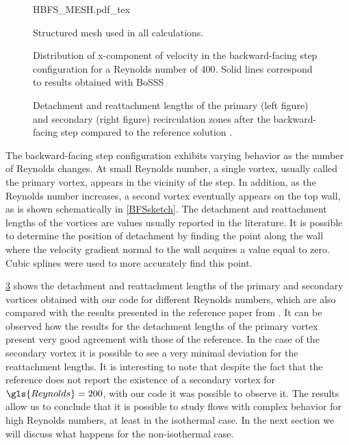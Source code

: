 \begin{figure}[tb]
	\begin{center}
		\def\svgwidth{0.8\textwidth}
		{HBFS_MESH.pdf_tex}
		\caption{Structured mesh used in all calculations. }
		\label{bfsmesh}
	\end{center}	
\end{figure} 

\begin{figure}[bt]
	\centering
	\caption{Distribution of x-component of velocity in the backward-facing step configuration for a Reynolds number of 400. Solid lines correspond to results obtained with BoSSS}
	\label{fig:uvelBFS}
\end{figure} 



\begin{figure}[tb]
	\centering
{}
	\caption{ Detachment and reattachment lengths of the primary (left figure) and secondary (right figure) recirculation zones after the backward-facing step compared to the reference solution \citep{biswasBackwardFacingStepFlows2004}.}
	\label{fig:Re_De_Attachmentlengths}
\end{figure}
The backward-facing step configuration exhibits varying behavior as the number of Reynolds changes. At small Reynolds number, a single vortex, usually called the primary vortex, appears in the vicinity of the step. In addition, as the Reynolds number increases, a second vortex eventually appears on the top wall, as is shown schematically in  \cref{BFSsketch}. 
The detachment and reattachment lengths of the vortices are values usually reported in the literature. It is possible to determine the position of detachment by finding the point along the wall where the velocity gradient normal to the wall acquires a value equal to zero. Cubic splines were used to more accurately find this point.

\cref{fig:Re_De_Attachmentlengths} shows the detachment and reattachment lengths of the primary and secondary vortices obtained with our code for different Reynolds numbers, which are also compared with the results presented in the reference paper from \cite{biswasBackwardFacingStepFlows2004}. It can be observed how the results for the detachment lengths of the primary vortex present very good agreement with those of the reference. In the case of the secondary vortex it is possible to see a very minimal deviation for the reattachment lengths. It is interesting to note that despite the fact that the reference does not report the existence of a secondary vortex for $\gls{Reynolds} = 200$, with our code it was possible to observe it. The results allow us to conclude that it is possible to study flows with complex behavior for high Reynolds numbers, at least in the isothermal case. In the next section we will discuss what happens for the non-isothermal case.


